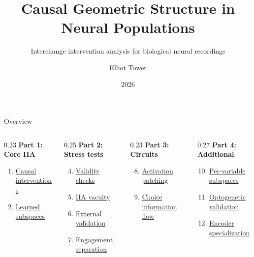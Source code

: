 \documentclass[aspectratio=169,11pt]{beamer}
\title{Causal Geometric Structure in Neural Populations}
\subtitle{Interchange intervention analysis for biological neural recordings}
\author{Elliot Tower}
\date{2026}
\institute{}
\begin{document}
\maketitle

\begin{frame}{Overview}

\vspace{0.5em}
{\small
\begin{columns}[T]
\begin{column}{0.23\textwidth}
\textbf{Part 1: Core IIA}
\begin{enumerate}
  \item \hyperlink{sec:1}{Causal interventions}
  \item \hyperlink{sec:2}{Learned subspaces}
\end{enumerate}
\end{column}
\begin{column}{0.25\textwidth}
\textbf{Part 2: Stress tests}
\begin{enumerate}
  \setcounter{enumi}{3}
  \item \hyperlink{sec:4}{Validity checks}
  \item \hyperlink{sec:5}{IIA vacuity}
  \item \hyperlink{sec:6}{External validation}
  \item \hyperlink{sec:7}{Engagement separation}
\end{enumerate}
\end{column}
\begin{column}{0.23\textwidth}
\textbf{Part 3: Circuits}
\begin{enumerate}
  \setcounter{enumi}{7}
  \item \hyperlink{sec:8}{Activation patching}
  \item \hyperlink{sec:9}{Choice information flow}
\end{enumerate}
\end{column}
\begin{column}{0.27\textwidth}
\textbf{Part 4: Additional}
\begin{enumerate}
  \setcounter{enumi}{9}
  \item \hyperlink{sec:10}{Per-variable subspaces}
  \item \hyperlink{sec:11}{Optogenetic validation}
  \item \hyperlink{sec:12}{Encoder specialization}
\end{enumerate}
\end{column}
\end{columns}
}
\end{frame}
\end{document}

